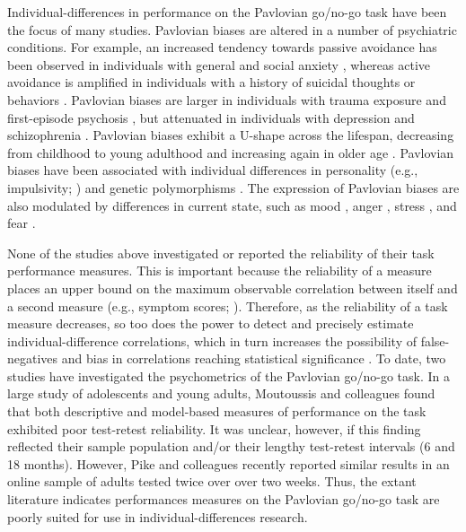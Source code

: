 \documentclass[a4paper,12pt]{article}
\begin{document}
\begin{refsection}[main]
Individual-differences in performance on the Pavlovian go/no-go task have been the focus of many studies. Pavlovian biases are altered in a number of psychiatric conditions. For example, an increased tendency towards passive avoidance has been observed in individuals with general and social anxiety \cite{mkrtchian2017modeling, peterburs2021impact}, whereas active avoidance is amplified in individuals with a history of suicidal thoughts or behaviors \cite{millner2019suicidal}.  Pavlovian biases are larger in individuals with trauma exposure \cite{ousdal2018impact} and first-episode psychosis \cite{montagnese2020reinforcement}, but attenuated in individuals with depression \cite{huys2016specificity} and schizophrenia \cite{albrecht2016reduction}. Pavlovian biases exhibit a U-shape across the lifespan, decreasing from childhood to young adulthood and increasing again in older age \cite{raab2020adolescents, betts2020learning}. Pavlovian biases have been associated with individual differences in personality (e.g., impulsivity; \cite{eisinger2020pavlovian}) and genetic polymorphisms \cite{richter2014valenced, richter2021motivational}. The expression of Pavlovian biases are also modulated by differences in current state, such as mood \cite{weber2022effects}, anger \cite{wonderlich2020anger}, stress \cite{de2016acute}, and fear \cite{mkrtchian2017threat}. 

None of the studies above investigated or reported the reliability of their task performance measures. This is important because the reliability of a measure places an upper bound on the maximum observable correlation between itself and a second measure (e.g., symptom scores; \cite{zorowitz2023improving}). Therefore, as the reliability of a task measure decreases, so too does the power to detect and precisely estimate individual-difference correlations, which in turn increases the possibility of false-negatives \cite{Parsons2019-jw} and bias in correlations reaching statistical significance \cite{gelman2014beyond}. To date, two studies have investigated the psychometrics of the Pavlovian go/no-go task. In a large study of adolescents and young adults, Moutoussis and colleagues \cite{moutoussis2018change} found that both descriptive and model-based measures of performance on the task exhibited poor test-retest reliability. It was unclear, however, if this finding reflected their sample population and/or their lengthy test-retest intervals (6 and 18 months). However, Pike and colleagues \cite{pike2022test} recently reported similar results in an online sample of adults tested twice over over two weeks. Thus, the extant literature indicates performances measures on the Pavlovian go/no-go task are poorly suited for use in individual-differences research.  


\end{refsection}
\end{document}
